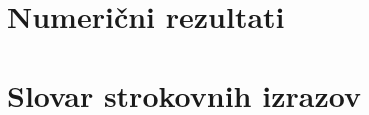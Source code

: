 \documentclass[mat1]{fmfdelo}
\newcommand{\pp}{\boldsymbol p}
\newcommand{\oo}{\boldsymbol o}
\newcommand{\uu}{\boldsymbol u}
\newcommand{\vv}{\boldsymbol v}
\begin{document}
\fi





\iffalse 

Ko sestavimo vse stvari skupaj, opišemo naš postopek z naslednjim algoritmom.\\
\textbf{Vhodni podatki:} začetna točka $\pp_z = d_z \oo_z$, končna točka $\pp_k = d_k \oo_k$, usmerjenost končnih točk $\left( \oo_z, \uu_z, \vv_z\right)$,  $\left( \oo_k, \uu_k, \vv_k\right)$, $\oo_z != \oo_k$.
\begin{enumerate}
	\item a
	\item b
\end{enumerate}
\fi

\section{Numerični rezultati}


\section*{Slovar strokovnih izrazov}

\geslo{}{}
\geslo{}{}

\begin{thebibliography}{99}


\end{thebibliography}
\end{document}
